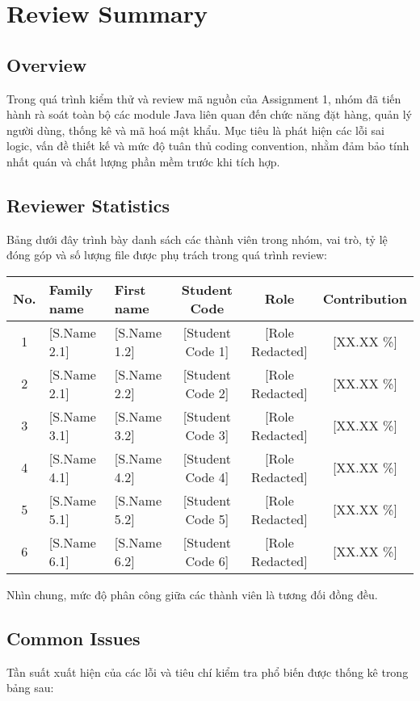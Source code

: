 \section{Review Summary}

\subsection{Overview}
Trong quá trình kiểm thử và review mã nguồn của Assignment 1, nhóm đã tiến hành rà soát toàn bộ các module Java liên quan đến chức năng đặt hàng, quản lý người dùng, thống kê và mã hoá mật khẩu.  
Mục tiêu là phát hiện các lỗi sai logic, vấn đề thiết kế và mức độ tuân thủ coding convention, nhằm đảm bảo tính nhất quán và chất lượng phần mềm trước khi tích hợp.

\subsection{Reviewer Statistics}
Bảng dưới đây trình bày danh sách các thành viên trong nhóm, vai trò, tỷ lệ đóng góp và số lượng file được phụ trách trong quá trình review:

\begin{longtable}{|c|l|l|c|c|c|}
\hline
\textbf{No.} & \textbf{Family name} & \textbf{First name} & \textbf{Student Code} & \textbf{Role} & \textbf{Contribution} \\
\hline
1 & [S.Name 2.1] & [S.Name 1.2] & [Student Code 1] & [Role Redacted] & [XX.XX \%] \\
\hline
2 & [S.Name 2.1] & [S.Name 2.2] & [Student Code 2] & [Role Redacted] & [XX.XX \%] \\
\hline
3 & [S.Name 3.1] & [S.Name 3.2] & [Student Code 3] & [Role Redacted] & [XX.XX \%] \\
\hline
4 & [S.Name 4.1] & [S.Name 4.2] & [Student Code 4] & [Role Redacted] & [XX.XX \%] \\
\hline
5 & [S.Name 5.1] & [S.Name 5.2] & [Student Code 5] & [Role Redacted] & [XX.XX \%] \\
\hline
6 & [S.Name 6.1] & [S.Name 6.2] & [Student Code 6] & [Role Redacted] & [XX.XX \%] \\
\hline
\end{longtable}

\noindent
Nhìn chung, mức độ phân công giữa các thành viên là tương đối đồng đều.  

\subsection{Common Issues}
Tần suất xuất hiện của các lỗi và tiêu chí kiểm tra phổ biến được thống kê trong bảng sau:

